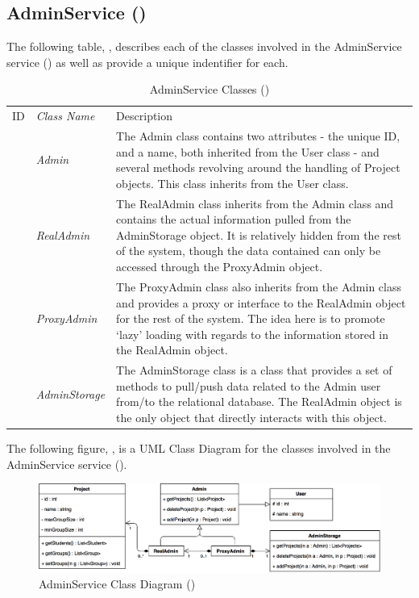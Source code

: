 \documentclass[12pt,letterpaper]{article}
\begin{document}
\subsection{AdminService ()}

The following table, , describes each of the classes involved in the AdminService service () as well as provide a unique indentifier for each.

\begin{table}[H]
	\caption{AdminService Classes ()} 
	\begin{tabu} to 
	    \tableheader{}ID & Class Name & Description \\
		 & Admin & The Admin class contains two attributes - the unique ID, and a name, both inherited from the User class - and several methods revolving around the handling of Project objects. This class inherits from the User class. \\
		 & RealAdmin & The RealAdmin class inherits from the Admin class and contains the actual information pulled from the AdminStorage object. It is relatively hidden from the rest of the system, though the data contained can only be accessed through the ProxyAdmin object. \\
		 & ProxyAdmin & The ProxyAdmin class also inherits from the Admin class and provides a proxy or interface to the RealAdmin object for the rest of the system. The idea here is to promote `lazy' loading with regards to the information stored in the RealAdmin object.\\
		 & AdminStorage & The AdminStorage class is a class that provides a set of methods to pull/push data related to the Admin user from/to the relational database. The RealAdmin object is the only object that directly interacts with this object.\\
	\end{tabu}
\end{table}

The following figure, , is a UML Class Diagram for the classes involved in the AdminService service ().

\begin{figure}[H]
	\centering{}
	\includegraphics[scale=0.27]{imgs/d3/interfaces/admin.png}
	\caption{AdminService Class Diagram ()}
\end{figure}
\end{document}
